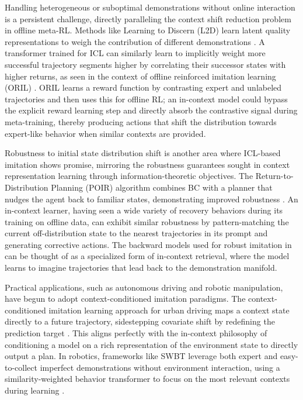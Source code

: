 \documentclass[11pt]{article}
\begin{document}
Handling heterogeneous or suboptimal demonstrations without online interaction is a persistent challenge, directly paralleling the context shift reduction problem in offline meta-RL. Methods like Learning to Discern (L2D) learn latent quality representations to weigh the contribution of different demonstrations \cite{ref358}. A transformer trained for ICL can similarly learn to implicitly weight more successful trajectory segments higher by correlating their successor states with higher returns, as seen in the context of offline reinforced imitation learning (ORIL) \cite{ref359}. ORIL learns a reward function by contrasting expert and unlabeled trajectories and then uses this for offline RL; an in-context model could bypass the explicit reward learning step and directly absorb the contrastive signal during meta-training, thereby producing actions that shift the distribution towards expert-like behavior when similar contexts are provided.

Robustness to initial state distribution shift is another area where ICL-based imitation shows promise, mirroring the robustness guarantees sought in context representation learning through information-theoretic objectives. The Return-to-Distribution Planning (POIR) algorithm combines BC with a planner that nudges the agent back to familiar states, demonstrating improved robustness \cite{ref360}. An in-context learner, having seen a wide variety of recovery behaviors during its training on offline data, can exhibit similar robustness by pattern-matching the current off-distribution state to the nearest trajectories in its prompt and generating corrective actions. The backward models used for robust imitation in \cite{ref347} can be thought of as a specialized form of in-context retrieval, where the model learns to imagine trajectories that lead back to the demonstration manifold.

Practical applications, such as autonomous driving and robotic manipulation, have begun to adopt context-conditioned imitation paradigms. The context-conditioned imitation learning approach for urban driving maps a context state directly to a future trajectory, sidestepping covariate shift by redefining the prediction target \cite{ref361}. This aligns perfectly with the in-context philosophy of conditioning a model on a rich representation of the environment state to directly output a plan. In robotics, frameworks like SWBT leverage both expert and easy-to-collect imperfect demonstrations without environment interaction, using a similarity-weighted behavior transformer to focus on the most relevant contexts during learning \cite{ref362}.
\end{document}
